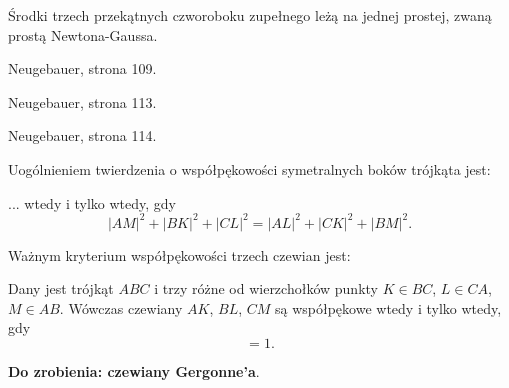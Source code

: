 \documentclass{parchment}
\begin{document}


\begin{proposition}
	Środki trzech przekątnych czworoboku zupełnego leżą na jednej prostej, zwaną prostą Newtona-Gaussa.
\end{proposition}

\begin{proposition}
	Neugebauer, strona 109.
\end{proposition}

\begin{proposition}
	Neugebauer, strona 113.
\end{proposition}

\begin{proposition}
	Neugebauer, strona 114.
\end{proposition}



Uogólnieniem twierdzenia o współpękowości symetralnych boków trójkąta jest:

\begin{proposition}
	... wtedy i tylko wtedy, gdy
	\begin{equation}
		|AM|^2 + |BK|^2 + |CL|^2 = |AL|^2 + |CK|^2 + |BM|^2.
	\end{equation}
\end{proposition}

Ważnym kryterium współpękowości trzech czewian jest:

\begin{proposition}
	Dany jest trójkąt $ABC$ i trzy różne od wierzchołków punkty $K \in BC$, $L \in CA$, $M \in AB$.
	Wówczas czewiany $AK$, $BL$, $CM$ są współpękowe wtedy i tylko wtedy, gdy
	\begin{equation}
		[AMB] [BKC] [CLA] = 1.
	\end{equation}
\end{proposition}

\textbf{Do zrobienia: czewiany Gergonne'a}.
\end{document}

